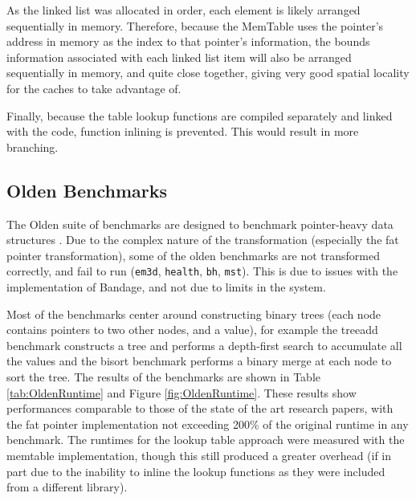 As the linked list was allocated in order, each element is likely arranged sequentially in memory.
Therefore, because the MemTable uses the pointer's address in memory as the index to that pointer's information, the bounds information associated with each linked list item will also be arranged sequentially in memory, and quite close together, giving very good spatial locality for the caches to take advantage of.

Finally, because the table lookup functions are compiled separately and linked with the code, function inlining is prevented.
This would result in more branching.

\subsection{Olden Benchmarks}

The Olden suite of benchmarks are designed to benchmark pointer-heavy data structures \cite{olden}.
Due to the complex nature of the transformation (especially the fat pointer transformation), some of the olden benchmarks are not transformed correctly, and fail to run (\verb!em3d!, \verb!health!, \verb!bh!, \verb!mst!).
This is due to issues with the implementation of Bandage, and not due to limits in the system.

Most of the benchmarks center around constructing binary trees (each node contains pointers to two other nodes, and a value), for example the treeadd benchmark constructs a tree and performs a depth-first search to accumulate all the values and the bisort benchmark performs a binary merge at each node to sort the tree.
The results of the benchmarks are shown in Table \ref{tab:OldenRuntime} and Figure \ref{fig:OldenRuntime}.
These results show performances comparable to those of the state of the art research papers, with the fat pointer implementation not exceeding 200\% of the original runtime in any benchmark.
The runtimes for the lookup table approach were measured with the memtable implementation, though this still produced a greater overhead (if in part due to the inability to inline the lookup functions as they were included from a different library).


